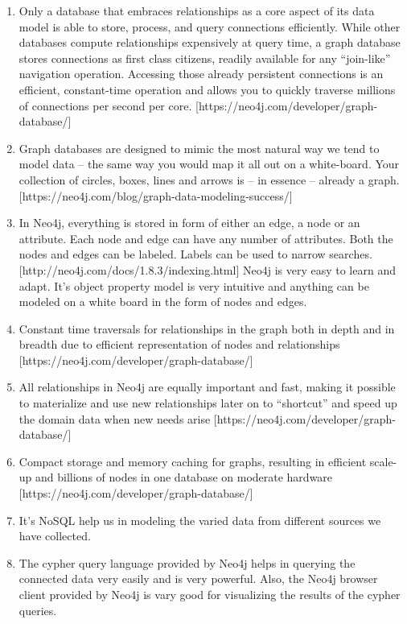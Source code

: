 \begin{enumerate}

\item Only a database that embraces relationships as a core aspect of its data model is able to store, process, and query connections efficiently. While other databases compute relationships expensively at query time, a graph database stores connections as first class citizens, readily available for any “join-like” navigation operation. Accessing those already persistent connections is an efficient, constant-time operation and allows you to quickly traverse millions of connections per second per core.  [https://neo4j.com/developer/graph-database/]

\item Graph databases are designed to mimic the most natural way we tend to model data – the same way you would map it all out on a white-board. Your collection of circles, boxes, lines and arrows is – in essence – already a graph. [https://neo4j.com/blog/graph-data-modeling-success/]

\item In Neo4j, everything is stored in form of either an edge, a node or an attribute. Each node and edge can have any number of attributes. Both the nodes and edges can be labeled. Labels can be used to narrow searches. [http://neo4j.com/docs/1.8.3/indexing.html] Neo4j is very easy to learn and adapt. It's object property model is very intuitive and anything can be modeled on a white board in the form of nodes and edges.

\item Constant time traversals for relationships in the graph both in depth and in breadth due to efficient representation of nodes and relationships [https://neo4j.com/developer/graph-database/]

\item All relationships in Neo4j are equally important and fast, making it possible to materialize and use new relationships later on to “shortcut” and speed up the domain data when new needs arise [https://neo4j.com/developer/graph-database/]

\item Compact storage and memory caching for graphs, resulting in efficient scale-up and billions of nodes in one database on moderate hardware [https://neo4j.com/developer/graph-database/]

\item It's NoSQL help us in modeling the varied data from different sources we have collected.

\item The cypher query language provided by Neo4j helps in querying the connected data very easily and is very powerful. Also, the Neo4j browser client provided by Neo4j is vary good for visualizing the results of the cypher queries.

\end{enumerate}

